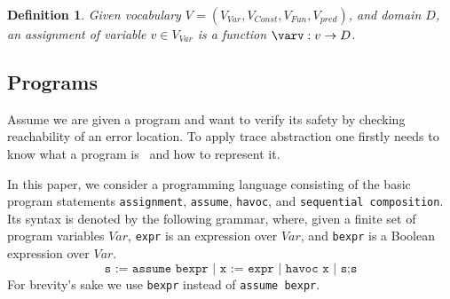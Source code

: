 \documentclass{article}
\newcommand{\Var}{\ensuremath{\mathit{Var}}\xspace}
\newcommand{\vocab}[1]{\ensuremath{V_{\mathit{#1}}}\xspace}
\newtheorem{mydef}{Definition}
\newcommand\mycom[1]{}
\newcommand\mycom[1]{#1}
\newcommand{\dd}[1]{\mycom{\todo[color=orange!40,inline]{\small DD: #1}}}
\begin{document}
\begin{mydef}
Given vocabulary $V = (\vocab{Var}, \vocab{Const}, \vocab{Fun}, \vocab{pred})$, and domain $D$, an assignment of variable $v \in \vocab{Var}$ is a function $\varv: v \rightarrow D$.
\end{mydef}

\subsection{Programs}

Assume we are given a program and want to verify its safety by checking reachability of an error location.
To apply trace abstraction one firstly needs to know what a program is~\cite{DBLP:journals/corr/GreitschusDP17} and how to represent it.

In this paper, we consider a programming language consisting of the basic program statements \texttt{assignment}, \texttt{assume}, \texttt{havoc}, and \texttt{sequential composition}.
Its syntax is denoted by the following grammar, where, given a finite set of program variables \Var, \texttt{expr} is an expression over \Var, and \texttt{bexpr} is a Boolean expression over \Var.
\begin{equation*}
	\texttt{s := assume bexpr | x := expr | havoc x | s;s}
\end{equation*}
For brevity's sake we use \texttt{bexpr} instead of \texttt{assume bexpr}.
\end{document}
